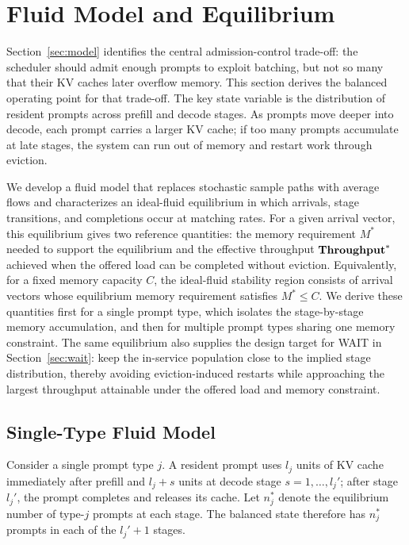 \section{Fluid Model and Equilibrium}\label{sec:fluid}
Section~\ref{sec:model} identifies the central admission-control trade-off: the scheduler should admit enough prompts to exploit batching, but not so many that their KV caches later overflow memory. This section derives the balanced operating point for that trade-off. The key state variable is the distribution of resident prompts across prefill and decode stages. As prompts move deeper into decode, each prompt carries a larger KV cache; if too many prompts accumulate at late stages, the system can run out of memory and restart work through eviction.

We develop a fluid model that replaces stochastic sample paths with average flows and characterizes an ideal-fluid equilibrium in which arrivals, stage transitions, and completions occur at matching rates. For a given arrival vector, this equilibrium gives two reference quantities: the memory requirement \(M^*\) needed to support the equilibrium and the effective throughput \(\textbf{Throughput}^*\) achieved when the offered load can be completed without eviction. Equivalently, for a fixed memory capacity \(C\), the ideal-fluid stability region consists of arrival vectors whose equilibrium memory requirement satisfies \(M^*\le C\). We derive these quantities first for a single prompt type, which isolates the stage-by-stage memory accumulation, and then for multiple prompt types sharing one memory constraint. The same equilibrium also supplies the design target for WAIT in Section~\ref{sec:wait}: keep the in-service population close to the implied stage distribution, thereby avoiding eviction-induced restarts while approaching the largest throughput attainable under the offered load and memory constraint.

\subsection{Single-Type Fluid Model}
Consider a single prompt type \(j\). A resident prompt uses \(l_j\) units of KV cache immediately after prefill and \(l_j+s\) units at decode stage \(s=1,\dots,l_j'\); after stage \(l_j'\), the prompt completes and releases its cache. Let \(n_j^*\) denote the equilibrium number of type-\(j\) prompts at each stage. The balanced state therefore has \(n_j^*\) prompts in each of the \(l_j'+1\) stages.

